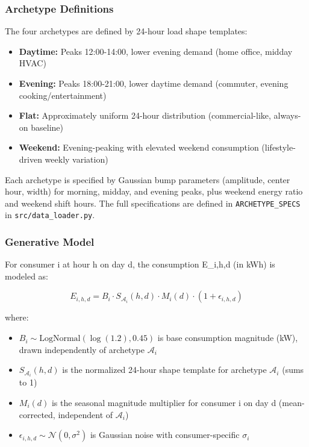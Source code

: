 \documentclass[11pt,a4paper]{article}
\begin{document}
\subsubsection{Archetype Definitions}

The four archetypes are defined by 24-hour load shape templates:

\begin{itemize}
    \item \textbf{Daytime:} Peaks 12:00-14:00, lower evening demand (home office, midday HVAC)
    \item \textbf{Evening:} Peaks 18:00-21:00, lower daytime demand (commuter, evening cooking/entertainment)
    \item \textbf{Flat:} Approximately uniform 24-hour distribution (commercial-like, always-on baseline)
    \item \textbf{Weekend:} Evening-peaking with elevated weekend consumption (lifestyle-driven weekly variation)
\end{itemize}

Each archetype is specified by Gaussian bump parameters (amplitude, center hour, width) for morning, midday, and evening peaks, plus weekend energy ratio and weekend shift hours. The full specifications are defined in \texttt{ARCHETYPE\_SPECS} in \texttt{src/data\_loader.py}.

\subsubsection{Generative Model}

For consumer i at hour h on day d, the consumption E_{i,h,d} (in kWh) is modeled as:

\begin{equation}
E_{i,h,d} = B_i \cdot S_{\mathcal{A}_i}(h, d) \cdot M_i(d) \cdot (1 + \epsilon_{i,h,d})
\end{equation}

where:
\begin{itemize}
    \item $B_i \sim \text{LogNormal}(\log(1.2), 0.45)$ is base consumption magnitude (kW), drawn independently of archetype $\mathcal{A}_i$
    \item $S_{\mathcal{A}_i}(h, d)$ is the normalized 24-hour shape template for archetype $\mathcal{A}_i$ (sums to 1)
    \item $M_i(d)$ is the seasonal magnitude multiplier for consumer i on day d (mean-corrected, independent of $\mathcal{A}_i$)
    \item $\epsilon_{i,h,d} \sim \mathcal{N}(0, \sigma^2)$ is Gaussian noise with consumer-specific $\sigma_i$
\end{itemize}
\end{document}
